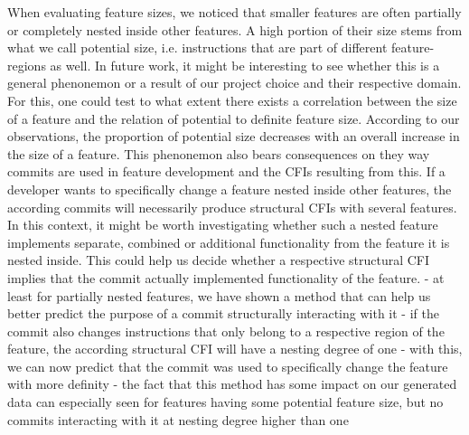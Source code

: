 When evaluating feature sizes, we noticed that smaller features are often partially or completely nested inside other features.
A high portion of their size stems from what we call potential size, i.e. instructions that are part of different feature-regions as well.
In future work, it might be interesting to see whether this is a general phenonemon or a result of our project choice and their respective domain.
For this, one could test to what extent there exists a correlation between the size of a feature and the relation of potential to definite feature size.
According to our observations, the proportion of potential size decreases with an overall increase in the size of a feature.
This phenonemon also bears consequences on they way commits are used in feature development and the CFIs resulting from this.
If a developer wants to specifically change a feature nested inside other features, the according commits will necessarily produce structural CFIs with several features.
In this context, it might be worth investigating whether such a nested feature implements separate, combined or additional functionality from the feature it is nested inside.
This could help us decide whether a respective structural CFI implies that the commit actually implemented functionality of the feature.
- at least for partially nested features, we have shown a method that can help us better predict the purpose of a commit structurally interacting with it
- if the commit also changes instructions that only belong to a respective region of the feature, the according structural CFI will have a nesting degree of one
- with this, we can now predict that the commit was used to specifically change the feature with more definity
- the fact that this method has some impact on our generated data can especially seen for features having some potential feature size, but no commits interacting with it at nesting degree higher than one

